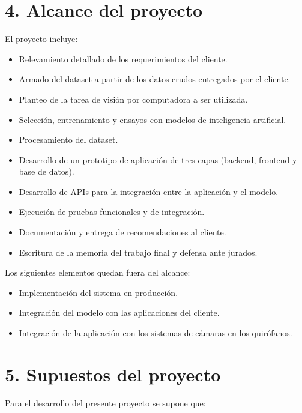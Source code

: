 \documentclass[
11pt, %
]{charter}
\begin{document}
\section{4. Alcance del proyecto}
\label{sec:alcance}

El proyecto incluye:
\begin{itemize}
	\item Relevamiento detallado de los requerimientos del cliente.
	\item Armado del dataset a partir de los datos crudos entregados por el cliente.
	\item Planteo de la tarea de visión por computadora a ser utilizada. 
	\item Selección, entrenamiento y ensayos con modelos de inteligencia artificial.
	\item Procesamiento del dataset.
	\item Desarrollo de un prototipo de aplicación de tres capas (backend, frontend y base de datos).
	\item Desarrollo de APIs para la integración entre la aplicación y el modelo.
	\item Ejecución de pruebas funcionales y de integración.
	\item Documentación y entrega de recomendaciones al cliente.
	\item Escritura de la memoria del trabajo final y defensa ante jurados.
	
\end{itemize}

Los siguientes elementos quedan fuera del alcance:
\begin{itemize}
	\item Implementación del sistema en producción.
	\item Integración del modelo con las aplicaciones del cliente.
	\item Integración de la aplicación con los sistemas de cámaras en los quirófanos. 

\end{itemize}



\section{5. Supuestos del proyecto}
\label{sec:supuestos}

Para el desarrollo del presente proyecto se supone que: 
\end{document}
